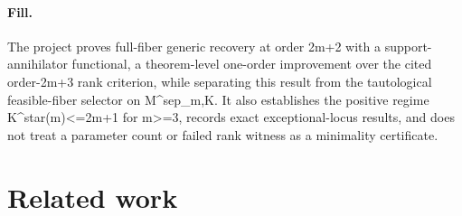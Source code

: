 \documentclass{article}
\begin{document}
\paragraph{Fill.} The project proves full-fiber generic recovery at order 2m+2 with a support-annihilator functional, a theorem-level one-order improvement over the cited order-2m+3 rank criterion, while separating this result from the tautological feasible-fiber selector on M^{sep}_{m,K}. It also establishes the positive regime K^star(m)<=2m+1 for m>=3, records exact exceptional-locus results, and does not treat a parameter count or failed rank witness as a minimality certificate.

\section{Related work}
\end{document}
